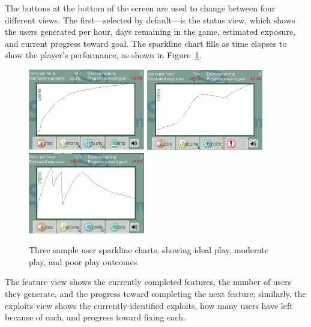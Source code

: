 \documentclass[letterpaper]{article}
\begin{document}
The buttons at the bottom of the screen are used to change between
four different views. The first---selected by default---is the
status view, which shows the users generated per hour,
days remaining in the game, estimated exposure, 
and current progress toward goal. The sparkline chart fills as time elapses
to show the player's performance, as shown in Figure~\ref{fig:chart}.
%
\begin{figure}\centering
\begin{framed}
\includegraphics[width=2in]{images/graph-plain.png}
\includegraphics[width=2in]{images/graph-moderate.png}
\includegraphics[width=2in]{images/graph-poor.png}
\caption{Three sample user sparkline charts, showing 
 ideal play, moderate play, and poor play outcomes}
\label{fig:chart}
\end{framed}
\end{figure}
%
The feature view shows the currently completed features, the number
of users they generate, and the progress toward completing the
next feature; similarly, the exploits view shows the currently-identified
exploits, how many users have left because of each, and progress
toward fixing each.
\end{document}
